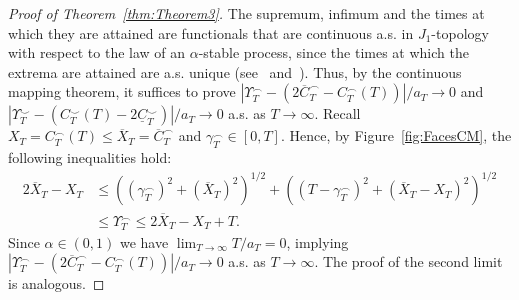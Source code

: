 \documentclass[AHL,Unicode,longabstracts,published]{cedram}
\newcommand\1{\mathds{1}}
\newcommand\ov[1]{\overline{#1}}
\newcommand\un[1]{\underline{#1}}
\begin{document}
\begin{proof}[Proof of Theorem~\ref{thm:Theorem3}]
The supremum, infimum and the times at which they are attained are functionals that are continuous a.s. in $J_1$-topology with respect to the law of an $\alpha$-stable process, since the times at which the extrema are attained are a.s. unique (see~\cite[Lemma~14.12]{MR1876169} and~\cite[Theorem~2]{MR2978134}). Thus, by the continuous mapping theorem, it suffices to prove $|\Upsilon_T^\frown-(2\ov{C}_T^\frown-C_T^\frown(T))|/a_T\to 0$ and $|\Upsilon_T^\smile-(C_T^\smile(T)-2\un{C}_T^\smile)|/a_T\to 0$ a.s. as $T\to\infty$. Recall $X_T=C_T^\frown(T)\le \ov X_T = \ov{C}_T^\frown$ and $\gamma^\frown_T\in[0,T]$. Hence, by Figure~\ref{fig:FacesCM}, the following inequalities hold:
\begin{align*}
2\ov X_T - X_T &\le \left(\left(\gamma^\frown_T\right)^2 + \left(\ov{X}_T\right)^2\right)^{1/2}+ \left(\left(T-\gamma^\frown_T\right)^2 + \left(\ov{X}_T-X_T\right)^2\right)^{1/2}\\
&\leq \Upsilon^\frown_T
\leq 2\ov X_T - X_T +T.
\end{align*}
Since $\alpha\in(0,1)$ we have $\lim_{T\to\infty} T/a_T= 0$, implying $|\Upsilon_T^\frown-(2\ov{C}_T^\frown-C_T^\frown(T))|/a_T\to 0$ a.s. as $T\to\infty$. The proof of the second limit is analogous.
\end{proof}
\end{document}
